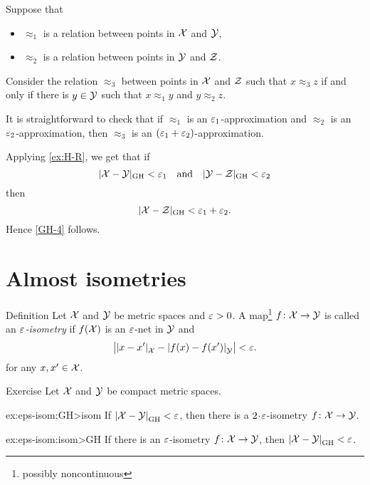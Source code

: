 Suppose that 
\begin{itemize}
\item $\approx_1$ is a relation between points in $\mathcal{X}$ and $\mathcal{Y}$,
\item $\approx_2$ is a relation between points in $\mathcal{Y}$ and $\mathcal{Z}$.
\end{itemize}
Consider the relation $\approx_3$ between points in $\mathcal{X}$ and $\mathcal{Z}$ such that
$x\approx_3 z$ if and only if there is $y\in  \mathcal{Y}$ such that 
$x\approx_1 y$ and $y\approx_2 z$.

It is straightforward to check that if $\approx_1$ is an $\varepsilon_1$-approximation and $\approx_2$ is an $\varepsilon_2$-approximation, then $\approx_3$ is an $(\varepsilon_1+\varepsilon_2)$-approximation.

Applying \ref{ex:H-R}, we get that if 
\[|\mathcal{X}-\mathcal{Y}|_{\operatorname{\rm GH}\nolimits}<\varepsilon_1
\quad\text{and}\quad
|\mathcal{Y}-\mathcal{Z}|_{\operatorname{\rm GH}\nolimits}<\varepsilon_2
\]
then 
\[|\mathcal{X}-\mathcal{Z}|_{\operatorname{\rm GH}\nolimits}<\varepsilon_1+\varepsilon_2.\]
Hence \ref{GH-4} follows.
\qeds


\section{Almost isometries}\label{sec:alm-isom}

\begin{thm}{Definition} Let $\mathcal{X}$ and $\mathcal{Y}$ be metric spaces and $\varepsilon>0$. 
A  map\footnote{possibly noncontinuous} $f\: \spc{X} \z\to \spc{Y}$ is called an \emph{$\varepsilon$-isometry} 
if $f(\mathcal{X})$ is an $\varepsilon$-net in $\mathcal{Y}$ and
\[\bigl|\dist{x}{x'}{\spc{X}}-\dist{f(x)}{f(x')}{\spc{Y}}\bigr|<\eps.\]
for any $x,x'\in \mathcal{X}$.
\end{thm}

\begin{thm}{Exercise}\label{ex:eps-isom}
Let $\mathcal{X}$ and $\mathcal{Y}$ be compact metric spaces.

\begin{subthm}{ex:eps-isom:GH>isom}
If $\dist{\spc{X}}{\spc{Y}}{\GH}<\eps$, then there is a $2\cdot\eps$-isometry $f\colon\mathcal{X}\to\mathcal{Y}$.
\end{subthm}

\begin{subthm}{ex:eps-isom:isom>GH}
If there is an $\varepsilon$-isometry $f\colon\mathcal{X}\to\mathcal{Y}$, then $\dist{\spc{X}}{\spc{Y}}{\GH}<\eps$.
\end{subthm}

\end{thm}

